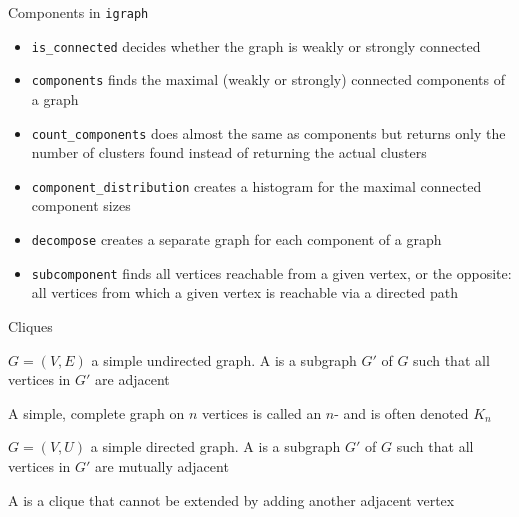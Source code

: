 \documentclass[aspectratio=169]{beamer}\usepackage[]{graphicx}\usepackage[]{xcolor}
\begin{document}
\begin{frame}{Components in {\tt igraph}}
\begin{itemize}
	\item {\tt is\_connected} decides whether the graph is weakly or strongly connected
	\item {\tt components} finds the maximal (weakly or strongly) connected components of a graph
	\item {\tt count\_components} does almost the same as components but returns only the number of clusters found instead of returning the actual clusters
	\item {\tt component\_distribution} creates a histogram for the maximal connected component sizes
	\item {\tt decompose} creates a separate graph for each component of a graph
	\item {\tt subcomponent} finds all vertices reachable from a given vertex, or the opposite: all vertices from which a given vertex is reachable via a directed path
\end{itemize}
\end{frame}
	


\begin{frame}{Cliques}
	\begin{definition}
		$G=(V,E)$ a simple undirected graph. A  is a subgraph $G'$ of $G$ such that all vertices in $G'$ are adjacent
	\end{definition}
	\begin{definition}[$n$-clique]
		A simple, complete graph on $n$ vertices is called an $n$- and is often denoted $K_n$
	\end{definition}
	\begin{definition}
		$G=(V,U)$ a simple directed graph. A  is a subgraph $G'$ of $G$ such that all vertices in $G'$ are mutually adjacent
	\end{definition}
	\begin{definition}
		A  is a clique that cannot be extended by adding another adjacent vertex
	\end{definition}
\end{frame}
\end{document}
